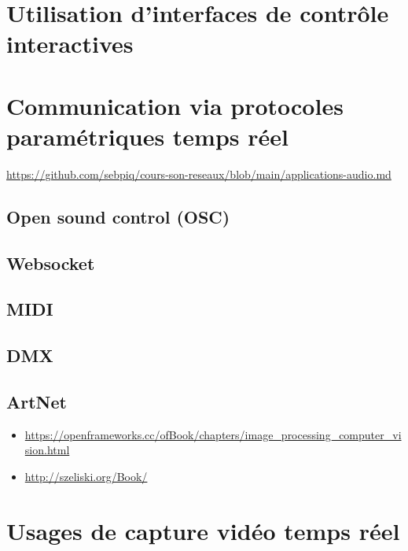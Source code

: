 \documentclass[
  french,
]{book}
\providecommand{\tightlist}{%
  \setlength{\itemsep}{0pt}\setlength{\parskip}{0pt}}
\begin{document}
\hypertarget{interagir_interfaces}{%
\section{Utilisation d'interfaces de contrôle interactives}\label{interagir_interfaces}}

\hypertarget{interagir_protocoles}{%
\section{Communication via protocoles paramétriques temps réel}\label{interagir_protocoles}}

\url{https://github.com/sebpiq/cours-son-reseaux/blob/main/applications-audio.md}

\hypertarget{protocole_osc}{%
\subsection{Open sound control (OSC)}\label{protocole_osc}}

\hypertarget{protocole_websocket}{%
\subsection{Websocket}\label{protocole_websocket}}

\hypertarget{protocole_midi}{%
\subsection{MIDI}\label{protocole_midi}}

\hypertarget{protocole_dmx}{%
\subsection{DMX}\label{protocole_dmx}}

\hypertarget{protocole_artnet}{%
\subsection{ArtNet}\label{protocole_artnet}}

\begin{itemize}
\tightlist
\item
  \url{https://openframeworks.cc/ofBook/chapters/image_processing_computer_vision.html}
\item
  \url{http://szeliski.org/Book/}
\end{itemize}

\hypertarget{usages-de-capture-viduxe9o-temps-ruxe9el}{%
\section{Usages de capture vidéo temps réel}\label{usages-de-capture-viduxe9o-temps-ruxe9el}}
\end{document}

